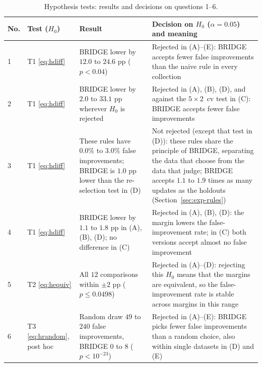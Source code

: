 \begin{table}[!t]
\centering
\footnotesize
\setlength{\tabcolsep}{4pt}
\renewcommand{\arraystretch}{1.2}
\caption{Hypothesis tests: results and decisions on questions 1--6.}
\label{tab:tests}
\begin{tabular}{@{}l>{\raggedright\arraybackslash}p{1.3cm}>{\raggedright\arraybackslash}p{6.1cm}>{\raggedright\arraybackslash}p{8.6cm}@{}}
\toprule
No. & Test ($H_0$) & Result & Decision on $H_0$ ($\alpha=0.05$) and meaning \\
\midrule
1 & T1 \eqref{eq:hdiff} & BRIDGE lower by $12.0$ to $24.6$ pp ($p<0.04$) & Rejected in (A)--(E): BRIDGE accepts fewer false improvements than the naive rule in every collection \\
2 & T1 \eqref{eq:hdiff} & BRIDGE lower by $2.0$ to $33.1$ pp wherever $H_0$ is rejected & Rejected in (A), (B), (D), and against the $5\times2$~cv test in (C): BRIDGE accepts fewer false improvements \\
3 & T1 \eqref{eq:hdiff} & These rules have $0.0\%$ to $3.0\%$ false improvements; BRIDGE is $1.0$ pp lower than the re-selection test in (D) & Not rejected (except that test in (D)): these rules share the principle of BRIDGE, separating the data that choose from the data that judge; BRIDGE accepts $1.1$ to $1.9$ times as many updates as the holdouts (Section~\ref{sec:exp-rules}) \\
4 & T1 \eqref{eq:hdiff} & BRIDGE lower by $1.1$ to $1.8$ pp in (A), (B), (D); no difference in (C) & Rejected in (A), (B), (D): the margin lowers the false-improvement rate; in (C) both versions accept almost no false improvement \\
5 & T2 \eqref{eq:hequiv} & All $12$ comparisons within $\pm2$ pp ($p\le0.0498$) & Rejected in (A)--(D): rejecting this $H_0$ means that the margins are equivalent, so the false-improvement rate is stable across margins in this range \\
6 & T3 \eqref{eq:hrandom}, post hoc & Random draw $49$ to $240$ false improvements, BRIDGE $0$ to $8$ ($p<10^{-23}$) & Rejected in (A)--(E): BRIDGE picks fewer false improvements than a random choice, also within single datasets in (D) and (E) \\
\bottomrule
\end{tabular}


\end{table}
